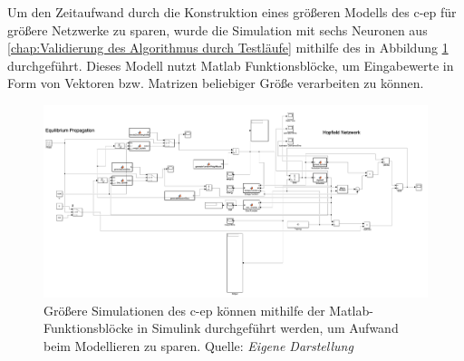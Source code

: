 Um den Zeitaufwand durch die Konstruktion eines größeren Modells des \ac{c-ep} für größere Netzwerke zu sparen, wurde die Simulation mit sechs Neuronen aus \ref{chap:Validierung des Algorithmus durch Testläufe} mithilfe des in Abbildung \ref{fig:C-EP Sim Simulink} durchgeführt. Dieses Modell nutzt Matlab Funktionsblöcke, um Eingabewerte in Form von Vektoren bzw. Matrizen beliebiger Größe verarbeiten zu können.

\begin{figure}[h]
  \includegraphics[width=\textwidth]{abbildungen/c-ep_sim_simulink.png}
  \caption{Größere Simulationen des \ac{c-ep} können mithilfe der Matlab-Funktionsblöcke in Simulink durchgeführt werden, um Aufwand beim Modellieren zu sparen. Quelle: \textit{Eigene Darstellung}}
  \label{fig:C-EP Sim Simulink}
\end{figure}
